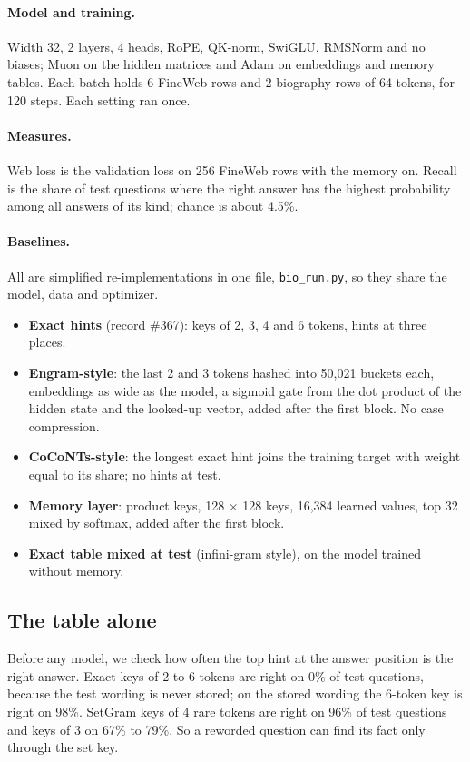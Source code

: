 \documentclass[11pt]{article}
\begin{document}
\paragraph{Model and training.} Width 32, 2 layers, 4 heads, RoPE, QK-norm, SwiGLU, RMSNorm and no biases; Muon on the hidden matrices and Adam on embeddings and memory tables. Each batch holds 6 FineWeb rows and 2 biography rows of 64 tokens, for 120 steps. Each setting ran once.

\paragraph{Measures.} Web loss is the validation loss on 256 FineWeb rows with the memory on. Recall is the share of test questions where the right answer has the highest probability among all answers of its kind; chance is about 4.5\%.

\paragraph{Baselines.} All are simplified re-implementations in one file, \texttt{bio\_run.py}, so they share the model, data and optimizer.
\begin{itemize}
\item \textbf{Exact hints} (record \#367): keys of 2, 3, 4 and 6 tokens, hints at three places.
\item \textbf{Engram-style}: the last 2 and 3 tokens hashed into 50,021 buckets each, embeddings as wide as the model, a sigmoid gate from the dot product of the hidden state and the looked-up vector, added after the first block. No case compression.
\item \textbf{CoCoNTs-style}: the longest exact hint joins the training target with weight equal to its share; no hints at test.
\item \textbf{Memory layer}: product keys, 128 $\times$ 128 keys, 16,384 learned values, top 32 mixed by softmax, added after the first block.
\item \textbf{Exact table mixed at test} (infini-gram style), on the model trained without memory.
\end{itemize}

\subsection{The table alone}
Before any model, we check how often the top hint at the answer position is the right answer. Exact keys of 2 to 6 tokens are right on 0\% of test questions, because the test wording is never stored; on the stored wording the 6-token key is right on 98\%. SetGram keys of 4 rare tokens are right on 96\% of test questions and keys of 3 on 67\% to 79\%. So a reworded question can find its fact only through the set key.
\end{document}

